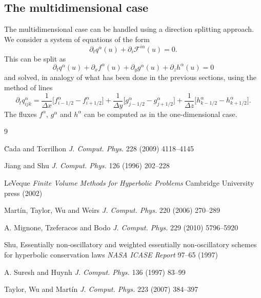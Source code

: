 \subsection{The multidimensional case}
The multidimensional case can be handled using a direction splitting approach.
We consider a system of equations of the form
\[
  \partial_t q^\alpha(u) + \partial_i \mathcal{F}^{i\alpha}(u) = 0.
\]
This can be split as
\[
  \partial_t q^\alpha(u) + \partial_x f^\alpha(u) + \partial_y g^\alpha(u) +
  \partial_z h^\alpha(u) = 0
\]
and solved, in analogy of what has been done in the previous sections, using the
method of lines
\[
  \partial_t q^\alpha_{ijk} =
  \frac{1}{\Delta x}\big[ f^\alpha_{i-1/2} - f^\alpha_{i+1/2} \big] +
  \frac{1}{\Delta y}\big[ g^\alpha_{j-1/2} - g^\alpha_{j+1/2} \big] +
  \frac{1}{\Delta z}\big[ h^\alpha_{k-1/2} - h^\alpha_{k+1/2} \big].
\]
The fluxes $f^\alpha$, $g^\alpha$ and $h^\alpha$ can be computed as in the
one-dimensional case.

\begin{thebibliography}{9}

{\u{C}ada and Torrilhon {\em J. Comput. Phys.} 228 (2009) 4118--4145}

{Jiang  and Shu {\em J. Comput. Phys.} 126 (1996) 202--228}

{LeVeque {\em Finite Volume Methods for Hyperbolic Problems} Cambridge
University press (2002)}

{Mart\'in, Taylor, Wu and Weirs {\em J. Comput. Phys.} 220 (2006)
270--289}

{A. Mignone, Tzeferacos and Bodo {\em J. Comput. Phys.} 229 (2010)
5796--5920}

{Shu, Essentially non-oscillatory and weighted essentially non-oscillatory
schemes for hyperbolic conservation laws {\em NASA ICASE Report} 97--65 (1997)}

{A. Suresh and Huynh {\em J. Comput. Phys.} 136 (1997) 83--99}

{Taylor, Wu and Mart\'in {\em J. Comput. Phys.} 223 (2007) 384--397}

\end{thebibliography}



